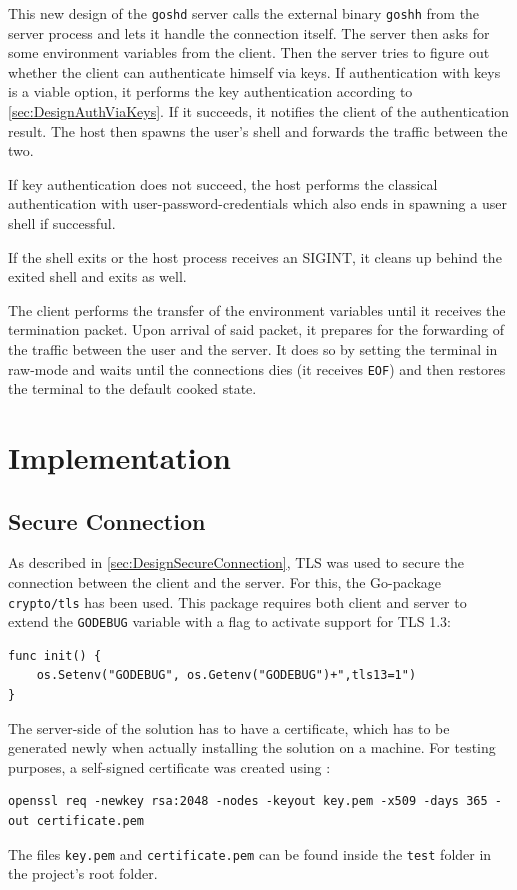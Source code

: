 \documentclass[10pt,a4paper,titlepage,twoside,english,final]{zhawreprt}
\begin{document}
This new design of the \texttt{goshd} server calls the external binary \texttt{goshh} from the server process and lets it handle the connection itself.
The server then asks for some environment variables from the client.
Then the server tries to figure out whether the client can authenticate himself via keys.
If authentication with keys is a viable option, it performs the key authentication according to \ref{sec:DesignAuthViaKeys}.
If it succeeds, it notifies the client of the authentication result.
The host then spawns the user's \gls{shell} and forwards the traffic between the two.

If key authentication does not succeed, the host performs the classical authentication with user-password-credentials which also ends in spawning a user \gls{shell} if successful.

If the \gls{shell} exits or the host process receives an \gls{SIGINT}, it cleans up behind the exited \gls{shell} and exits as well.

The client performs the transfer of the environment variables until it receives the termination packet.
Upon arrival of said packet, it prepares for the forwarding of the traffic between the user and the server.
It does so by setting the \gls{terminal} in raw-mode and waits until the connections dies (it receives \texttt{EOF}) and then restores the \gls{terminal} to the default cooked state.


\chapter{Implementation}\label{chp:Implementation}
\section{Secure Connection}\label{sec:ImplSecureConnection}
As described in \ref{sec:DesignSecureConnection}, \gls{TLS} was used to secure the connection between the client and the server.
For this, the \gls{Go}-package \texttt{crypto/tls} has been used.
This package requires both client and server to extend the \texttt{GODEBUG} variable with a flag to activate support for \gls{TLS} 1.3:
\setlistingGo
\begin{lstlisting}[caption={Activating \gls{TLS} 1.3 in \gls{Go}},label=lst:TlsInGo]
func init() {
    os.Setenv("GODEBUG", os.Getenv("GODEBUG")+",tls13=1")
}
\end{lstlisting}
The server-side of the solution has to have a certificate, which has to be generated newly when actually installing the solution on a machine.
For testing purposes, a self-signed certificate was created using \cite{openssl}:
\setlistingBash
\begin{lstlisting}[caption={Generating a self-signed certificate and private key},label=lst:GenCertNKey]
openssl req -newkey rsa:2048 -nodes -keyout key.pem -x509 -days 365 -out certificate.pem
\end{lstlisting}
The files \texttt{key.pem} and \texttt{certificate.pem} can be found inside the \texttt{test} folder in the project's root folder.
\end{document}
